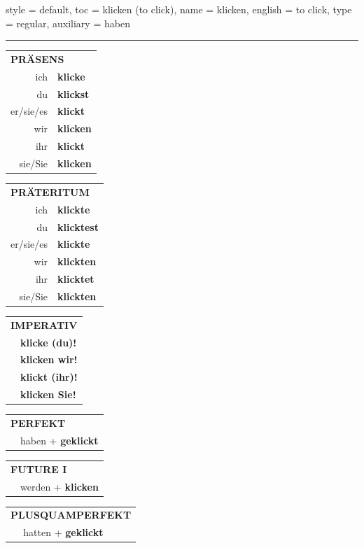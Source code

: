 \begin{verbentry}{
  style = {default},
  toc = {klicken (to click)},
  name = {klicken},
  english = {to click},
  type = {regular},
  auxiliary = {haben}
}
 

\vspace{5pt}
\hrule
\vspace{5pt}

\begin{tabular}{rl}
\multicolumn{2}{l}{\textbf{PRÄSENS}}\\
ich & \textbf{klicke}\\
du & \textbf{klickst}\\
er/sie/es & \textbf{klickt}\\
wir & \textbf{klicken}\\
ihr & \textbf{klickt}\\
sie/Sie & \textbf{klicken}\\
\end{tabular}
\hfill
\begin{tabular}{rl}
\multicolumn{2}{l}{\textbf{PRÄTERITUM}}\\
ich & \textbf{klickte}\\
du & \textbf{klicktest}\\
er/sie/es & \textbf{klickte}\\
wir & \textbf{klickten}\\
ihr & \textbf{klicktet}\\
sie/Sie & \textbf{klickten}\\
\end{tabular}
\hfill
\begin{tabular}{rl}
\multicolumn{2}{l}{\textbf{IMPERATIV}}\\
& \textbf{klicke (du)!}\\
& \textbf{klicken wir!}\\
& \textbf{klickt (ihr)!}\\
& \textbf{klicken Sie!}\\
\end{tabular}

\vspace{10pt}

\begin{tabular}{rl}
\multicolumn{2}{l}{\textbf{PERFEKT}}\\
& haben + \textbf{geklickt}\\
\end{tabular}
\hfill
\begin{tabular}{rl}
\multicolumn{2}{l}{\textbf{FUTURE I}}\\
& werden + \textbf{klicken}\\
\end{tabular}
\hfill
\begin{tabular}{rl}
\multicolumn{2}{l}{\textbf{PLUSQUAMPERFEKT}}\\
& hatten + \textbf{geklickt}\\
\end{tabular}


\end{verbentry}
